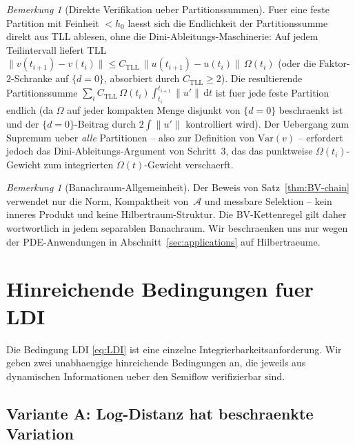 \documentclass[12pt,a4paper]{article}
\theoremstyle{definition}
\theoremstyle{plain}
\theoremstyle{remark}
\newtheorem{remark}[definition]{Bemerkung}
\newcommand{\Var}{\mathrm{Var}}
\begin{document}
\begin{remark}[Direkte Verifikation ueber Partitionssummen]
\label{rem:partition-sum}
Fuer eine feste Partition mit Feinheit $< h_0$ laesst sich die
Endlichkeit der Partitionssumme direkt aus TLL ablesen, ohne die
Dini-Ableitungs-Maschinerie: Auf jedem Teilintervall liefert TLL
$\|v(t_{i+1}) - v(t_i)\|
\le C_{\mathrm{TLL}}\,\|u(t_{i+1}) - u(t_i)\|\,\Omega(t_i)$
(oder die Faktor-$2$-Schranke auf $\{d = 0\}$, absorbiert durch
$C_{\mathrm{TLL}} \ge 2$).  Die resultierende Partitionssumme
$\sum_i C_{\mathrm{TLL}}\,\Omega(t_i)\int_{t_i}^{t_{i+1}}
\|u'\|\,\mathrm{d}t$ ist fuer jede feste Partition endlich
(da $\Omega$ auf jeder kompakten Menge disjunkt von $\{d=0\}$
beschraenkt ist und der $\{d=0\}$-Beitrag durch $2\int\|u'\|$
kontrolliert wird).  Der Uebergang zum Supremum ueber \emph{alle}
Partitionen -- also zur Definition von
$\Var(v)$ -- erfordert jedoch das Dini-Ableitungs-Argument
von Schritt~3, das das punktweise $\Omega(t_i)$-Gewicht
zum integrierten $\Omega(t)$-Gewicht verschaerft.
\end{remark}

\begin{remark}[Banachraum-Allgemeinheit]
\label{rem:banach}
Der Beweis von Satz~\ref{thm:BV-chain} verwendet nur die Norm,
Kompaktheit von~$\mathcal{A}$ und messbare Selektion -- kein
inneres Produkt und keine Hilbertraum-Struktur.  Die
BV-Kettenregel gilt daher wortwortlich in jedem separablen
Banachraum.  Wir beschraenken uns nur wegen der PDE-Anwendungen
in Abschnitt~\ref{sec:applications} auf Hilbertraeume.
\end{remark}


\section{Hinreichende Bedingungen fuer LDI}
\label{sec:sufficient}

Die Bedingung LDI \eqref{eq:LDI} ist eine einzelne
Integrierbarkeitsanforderung.  Wir geben zwei unabhaengige
hinreichende Bedingungen an, die jeweils aus dynamischen
Informationen ueber den Semiflow verifizierbar sind.

\subsection{Variante A: Log-Distanz hat beschraenkte Variation}
\end{document}
